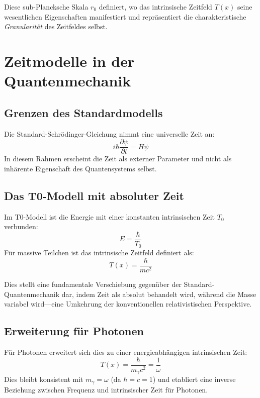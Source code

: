 \documentclass[12pt,a4paper]{article}
\newcommand{\Tfield}{T(x)}
\begin{document}
	Diese sub-Plancksche Skala \(r_0\) definiert, wo das intrinsische Zeitfeld \(\Tfield\) seine wesentlichen Eigenschaften manifestiert und repräsentiert die charakteristische \emph{Granularität} des Zeitfeldes selbst.
	
	\section{Zeitmodelle in der Quantenmechanik}
	\subsection{Grenzen des Standardmodells}
	Die Standard-Schrödinger-Gleichung nimmt eine universelle Zeit an:
	\begin{equation}
		i\hbar\frac{\partial\psi}{\partial t} = H\psi
	\end{equation}
	In diesem Rahmen erscheint die Zeit als externer Parameter und nicht als inhärente Eigenschaft des Quantensystems selbst.
	
	\subsection{Das T0-Modell mit absoluter Zeit}
	Im T0-Modell ist die Energie mit einer konstanten intrinsischen Zeit \(T_0\) verbunden:
	\begin{equation}
		E = \frac{\hbar}{T_0}
	\end{equation}
	Für massive Teilchen ist das intrinsische Zeitfeld definiert als:
	\begin{equation}
		\Tfield = \frac{\hbar}{m c^2}
	\end{equation}
	
	Dies stellt eine fundamentale Verschiebung gegenüber der Standard-Quantenmechanik dar, indem Zeit als absolut behandelt wird, während die Masse variabel wird—eine Umkehrung der konventionellen relativistischen Perspektive.
	
	\subsection{Erweiterung für Photonen}
	Für Photonen erweitert sich dies zu einer energieabhängigen intrinsischen Zeit:
	\begin{equation}
		\Tfield = \frac{\hbar}{m_\gamma c^2} = \frac{1}{\omega}
	\end{equation}
	Dies bleibt konsistent mit \(m_\gamma = \omega\) (da \(\hbar = c = 1\)) und etabliert eine inverse Beziehung zwischen Frequenz und intrinsischer Zeit für Photonen.
	
\end{document}
